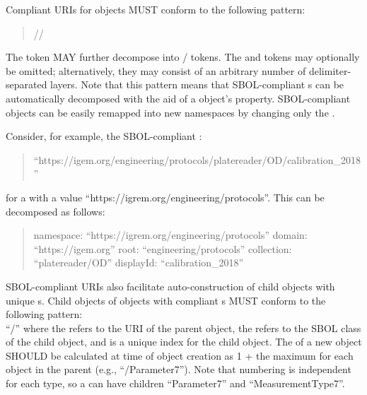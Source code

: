 Compliant URIs for  objects MUST conform to the following pattern:
\begin{quotation} 
//
\end{quotation}

The  token MAY further decompose into / tokens. The  and  tokens may optionally be omitted; alternatively, they may consist of an arbitrary number of delimiter-separated layers. Note that this pattern means that SBOL-compliant s can be automatically decomposed with the aid of a  object's  property. SBOL-compliant objects can be easily remapped into new namespaces by changing only the .

Consider, for example, the SBOL-compliant :
\begin{quote}``https://igem.org/engineering/protocols/platereader/OD/calibration\_2018''\end{quote} 
for a  with a  value ``https://igrem.org/engineering/protocols''.
This  can be decomposed as follows:
\begin{quote} 
namespace: ``https://igrem.org/engineering/protocols'' \linebreak
domain: ``https://igem.org'' \linebreak
root: ``engineering/protocols'' \linebreak
collection: ``platereader/OD'' \linebreak
displayId: ``calibration\_2018'' \linebreak
\end{quote}

SBOL-compliant URIs also facilitate auto-construction of child objects with unique s. 
Child objects of  objects with compliant s MUST conform to the following pattern:\\ ``/'' where the  refers to the URI of the parent object, the  refers to the SBOL class of the child object, and  is a unique index for the child object. 
The  of a new object SHOULD be calculated at time of object creation as 1 + the maximum  for each  object in the parent (e.g., ``/Parameter7''). 
Note that numbering is independent for each type, so a  can have children ``Parameter7'' and ``MeasurementType7''.

